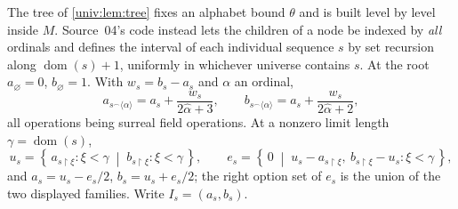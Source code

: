 \documentclass[11pt,letterpaper]{article}
\numberwithin{equation}{section}
\theoremstyle{definition}
\theoremstyle{remark}
\newcommand{\dom}{\operatorname{dom}}
\newcommand{\res}{\mathbin{\upharpoonright}}
\newcommand{\cat}{\mathbin{{}^{\frown}}}
\newcommand{\cut}[2]{\left\{\,#1\;\middle|\;#2\,\right\}}
\newcommand{\seq}[1]{\langle#1\rangle}
\newcommand{\hatord}[1]{\widehat{#1}}
\begin{document}
The tree of \cref{univ:lem:tree} fixes an alphabet bound $\theta$ and is built
level by level inside $M$. Source~04's code instead lets the children of a node
be indexed by \emph{all} ordinals and defines the interval of each individual
sequence $s$ by set recursion along $\dom(s)+1$, uniformly in whichever
universe contains $s$. At the root $a_\varnothing=0$, $b_\varnothing=1$. With
$w_s=b_s-a_s$ and $\alpha$ an ordinal,
\begin{equation}\label{univ:eq:childab}
 a_{s\cat\seq\alpha}=a_s+\frac{w_s}{2\hatord\alpha+3},\qquad
 b_{s\cat\seq\alpha}=a_s+\frac{w_s}{2\hatord\alpha+2},
\end{equation}
all operations being surreal field operations. At a nonzero limit length
$\gamma=\dom(s)$,
\begin{equation}\label{univ:eq:limitcenter}
 u_s=\cut{a_{s\res\xi}:\xi<\gamma}{b_{s\res\xi}:\xi<\gamma},\qquad
 e_s=\cut{0}{u_s-a_{s\res\xi},\ b_{s\res\xi}-u_s:\xi<\gamma},
\end{equation}
and $a_s=u_s-e_s/2$, $b_s=u_s+e_s/2$; the right option set of $e_s$ is the
union of the two displayed families. Write $I_s=(a_s,b_s)$.
\end{document}

